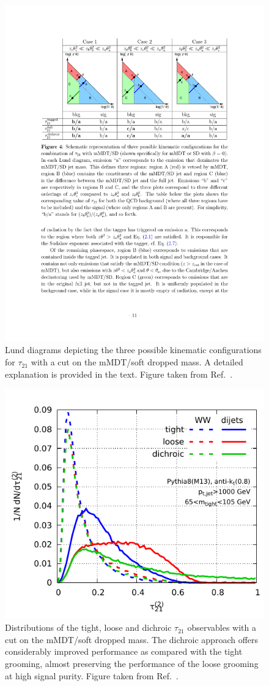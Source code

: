 \documentclass[11pt,letterpaper]{article}
\DeclareRobustCommand{\Ref}[1]{Ref.~\cite{#1}}
\begin{document}
\begin{figure}[t]
\begin{center}
\includegraphics[width=0.9\columnwidth]{figures/dichroic_placeholder}
\end{center}
\caption{Lund diagrams depicting the three possible kinematic configurations for $\tau_{21}$ with a cut on the mMDT/soft dropped mass. A detailed explanation is provided in the text. Figure taken from \Ref{Salam:2016yht}.}
\label{fig:dichroic}
\end{figure}

\begin{figure}[t]
\begin{center}
\includegraphics[width=0.5\columnwidth]{figures/dichroic-illust}
\end{center}
\caption{Distributions of the tight, loose and dichroic $\tau_{21}$ observables with a cut on the mMDT/soft dropped mass. The dichroic approach offers considerably improved performance as compared with the tight grooming, almost preserving the performance of the loose grooming at high signal purity. Figure taken from \Ref{Salam:2016yht}.}
\label{fig:dichroic_distribution}
\end{figure}
\end{document}
